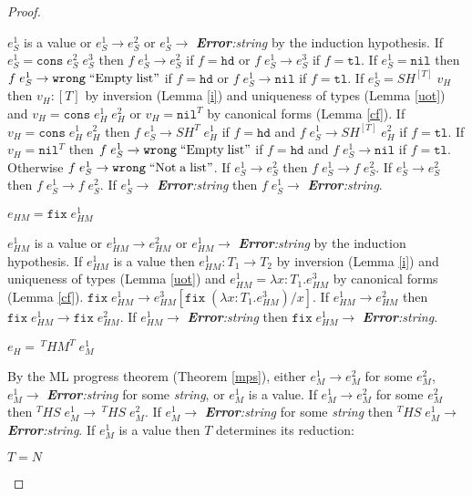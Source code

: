 \begin{theorem}
\begin{proof}
\begin{case}
$e_{S}^{1}$ is a value or $e_{S}^{1}\rightarrow e_{S}^{2}$ or $e_{S}^{1}\rightarrow$ \emph{\textbf{Error}:\;string} by the induction hypothesis.  If $e_{S}^{1}=\mathtt{cons}\;e_{S}^{2}\;e_{S}^{3}$ then $f\;e_{S}^{1}\rightarrow e_{S}^{2}$ if $f=\mathtt{hd}$ or $f\;e_{S}^{1}\rightarrow e_{S}^{3}$ if $f=\mathtt{tl}$.  If $e_{S}^{1}=\mathtt{nil}$ then $f\;e_{S}^{1}\rightarrow\mathtt{wrong}\;\mathrm{``Empty\;list"}$ if $f=\mathtt{hd}$ or $f\;e_{S}^{1}\rightarrow\mathtt{nil}$ if $f=\mathtt{tl}$.  If $e_{S}^{1}=SH^{[T]}\;v_{H}$ then $v_{H}:[T]$ by inversion (Lemma \ref{i}) and uniqueness of types (Lemma \ref{uot}) and $v_{H}=\mathtt{cons}\;e_{H}^{1}\;e_{H}^{2}$ or $v_{H}=\mathtt{nil}^{T}$ by canonical forms (Lemma \ref{cf}).  If $v_{H}=\mathtt{cons}\;e_{H}^{1}\;e_{H}^{2}$ then $f\;e_{S}^{1}\rightarrow SH^{T}\;e_{H}^{1}$ if $f=\mathtt{hd}$ and $f\;e_{S}^{1}\rightarrow SH^{[T]}\;e_{H}^{2}$ if $f=\mathtt{tl}$.  If $v_{H}=\mathtt{nil}^{T}$ then $f\;e_{S}^{1}\rightarrow\mathtt{wrong}\;\mathrm{``Empty\;list"}$ if $f=\mathtt{hd}$ and $f\;e_{S}^{1}\rightarrow\mathtt{nil}$ if $f=\mathtt{tl}$.  Otherwise $f\;e_{S}^{1}\rightarrow\mathtt{wrong}\;\mathrm{``Not\;a\;list"}$.  If $e_{S}^{1}\rightarrow e_{S}^{2}$ then $f\;e_{S}^{1}\rightarrow f\;e_{S}^{2}$.  If $e_{S}^{1}\rightarrow e_{S}^{2}$ then $f\;e_{S}^{1}\rightarrow f\;e_{S}^{2}$.  If $e_{S}^{1}\rightarrow$ \emph{\textbf{Error}:\;string} then $f\;e_{S}^{1}\rightarrow$ \emph{\textbf{Error}:\;string}.
\end{case}
\begin{case}
$e_{HM}=\mathtt{fix}\;e_{HM}^{1}$

$e_{HM}^{1}$ is a value or $e_{HM}^{1}\rightarrow e_{HM}^{2}$ or $e_{HM}^{1}\rightarrow$ \emph{\textbf{Error}:\;string} by the induction hypothesis.  If $e_{HM}^{1}$ is a value then $e_{HM}^{1}:T_{1}\rightarrow T_{2}$ by inversion (Lemma \ref{i}) and uniqueness of types (Lemma \ref{uot}) and $e_{HM}^{1}=\lambda x:T_{1}.e_{HM}^{3}$ by canonical forms (Lemma \ref{cf}).  $\mathtt{fix}\;e_{HM}^{1}\rightarrow e_{HM}^{3}[\mathtt{fix}\;(\lambda x:T_{1}.e_{HM}^{3})/x]$.  If $e_{HM}^{1}\rightarrow e_{HM}^{2}$ then $\mathtt{fix}\;e_{HM}^{1}\rightarrow\mathtt{fix}\;e_{HM}^{2}$.  If $e_{HM}^{1}\rightarrow$ \emph{\textbf{Error}:\;string} then $\mathtt{fix}\;e_{HM}^{1}\rightarrow$ \emph{\textbf{Error}:\;string}.
\end{case}
\begin{case}
$e_{H}=\,^{T}HM^{T}\;e_{M}^{1}$

By the ML progress theorem (Theorem \ref{mps}), either $e_{M}^{1}\rightarrow e_{M}^{2}$ for some $e_{M}^{2}$, $e_{M}^{1}\rightarrow$ \emph{\textbf{Error}:\;string} for some \emph{string}, or $e_{M}^{1}$ is a value.  If $e_{M}^{1}\rightarrow e_{M}^{2}$ for some $e_{M}^{2}$ then $^{T}HS\;e_{M}^{1}\rightarrow\,^{T}HS\;e_{M}^{2}$.  If $e_{M}^{1}\rightarrow$ \emph{\textbf{Error}:\;string} for some \emph{string} then $^{T}HS\;e_{M}^{1}\rightarrow$ \emph{\textbf{Error}:\;string}.  If $e_{M}^{1}$ is a value then $T$ determines its reduction:
\begin{case}
$T=N$


\end{case}
\end{case}
\end{proof}
\end{theorem}
